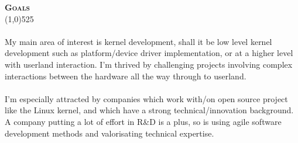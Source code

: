 \documentclass[letterpaper,11pt]{article}
\newcommand{\titlecolor}[0]{RoyalBlue4}
\newcommand{\resheading}[1]{
  \vspace{10pt}
  {\Large
        \textsc{\textcolor{\titlecolor}{\textbf{#1}}}
  } \\
  \vspace{-10.5pt}
  \hspace{-1pt}\textcolor{\titlecolor}{\line(1,0){525}}
}
\begin{document}
\vspace{8pt}
\resheading{Goals}
\begin{minipage}{0.95\linewidth}
\vspace{10pt}
\paragraph{}
My main area of interest is kernel development, shall it be low level kernel
development such as platform/device driver implementation, or at a higher level
with userland interaction. I'm thrived by challenging projects involving
complex interactions between the hardware all the way through to userland.
\paragraph{}
I'm especially attracted by companies which work with/on open source project
like the Linux kernel, and which have a strong technical/innovation
background. A company putting a lot of effort in R\&D is a plus, so is 
using agile software development methods and valorisating technical
expertise.

\end{minipage}
\end{document}

